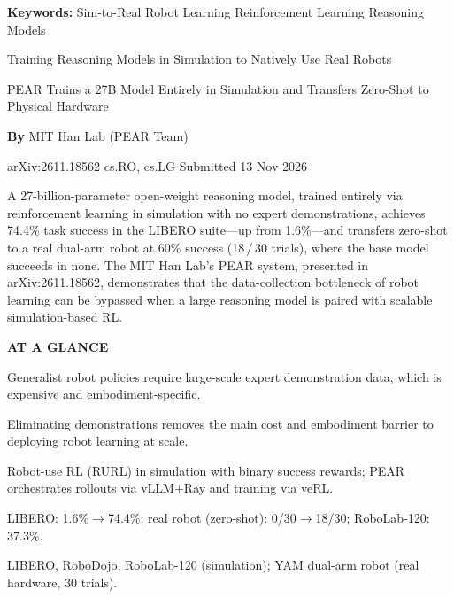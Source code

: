 \documentclass[10pt,twocolumn]{article}
\begin{document}
\setlength{\parindent}{0pt}
\setlength{\parskip}{4pt}

{\small\color{keywordgray}\textbf{Keywords:}
  Sim-to-Real \textbullet{} Robot Learning \textbullet{} Reinforcement Learning \textbullet{} Reasoning Models}\par\vspace{4pt}

{\LARGE\bfseries\raggedright Training Reasoning Models in Simulation to Natively Use Real Robots}\par\vspace{4pt}
{\large\itshape\raggedright PEAR Trains a 27B Model Entirely in Simulation and Transfers Zero-Shot to Physical Hardware}\par\vspace{6pt}
{\small\textbf{By} MIT Han Lab (PEAR Team)}\par\vspace{2pt}
{\small\color{keywordgray}arXiv:2611.18562 \textbullet{} cs.RO, cs.LG \textbullet{} Submitted 13 Nov 2026}
\par\vspace{2pt}\noindent{\color{rulered}\rule{\columnwidth}{0.6pt}}\vspace{6pt}

A 27-billion-parameter open-weight reasoning model, trained entirely via reinforcement learning in simulation with no expert demonstrations, achieves 74.4\% task success in the LIBERO suite---up from 1.6\%---and transfers zero-shot to a real dual-arm robot at 60\% success (18\,/\,30 trials), where the base model succeeds in none.
The MIT Han Lab's PEAR system, presented in arXiv:2611.18562, demonstrates that the data-collection bottleneck of robot learning can be bypassed when a large reasoning model is paired with scalable simulation-based RL.

\begin{mdframed}[backgroundcolor=boxgray,linecolor=rulered,linewidth=1pt,
    innerleftmargin=6pt,innerrightmargin=6pt,
    innertopmargin=6pt,innerbottommargin=6pt]
\textbf{\small AT A GLANCE}\par\vspace{4pt}
\begin{description}[leftmargin=0pt,labelsep=4pt,itemsep=2pt,parsep=0pt,
    font=\small\bfseries]
  \item[Problem:] Generalist robot policies require large-scale expert demonstration data, which is expensive and embodiment-specific.
  \item[Why it matters:] Eliminating demonstrations removes the main cost and embodiment barrier to deploying robot learning at scale.
  \item[Method:] Robot-use RL (RURL) in simulation with binary success rewards; PEAR orchestrates rollouts via vLLM+Ray and training via veRL.
  \item[Result:] LIBERO: 1.6\%$\rightarrow$74.4\%; real robot (zero-shot): 0/30$\rightarrow$18/30; RoboLab-120: 37.3\%.
  \item[Evidence:] LIBERO, RoboDojo, RoboLab-120 (simulation); YAM dual-arm robot (real hardware, 30 trials).
\end{description}
\end{mdframed}
\end{document}
